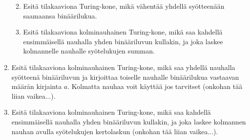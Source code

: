 \documentclass[finnish,11pt,draft]{article}
\begin{document}
\begin{enumerate}
\begin{enumerate}
\begin{enumerate}
\end{enumerate}

\item
Esitä  
tilakaaviona Turing-kone, mikä vähentää yhdellä syötteenään saamaansa binäärilukua. 




\item
Esitä tilakaaviona kolminauhainen Turing-kone, mikä saa kahdellä ensimmäisellä nauhalla yhden binääriluvun kullakin, ja joka laskee kolmannelle nauhalle syötelukujen summan.




 
\end{enumerate}


\item 
Esitä tilakaaviona kolminauhainen  Turing-kone, mikä saa yhdellä nauhalla syötteenä binääriluvun ja kirjoittaa toiselle nauhalle binäärilukua vastaavan määrän kirjainta $a$. Kolmatta nauhaa voit käyttää jos tarvitset (onkohan tää liian vaikea...).

\item
Esitä tilakaaviona kolminauhainen  Turing-kone, 
mikä saa kahdellä ensimmäisellä nauhalla yhden binääriluvun kullakin, ja joka laskee kolmannen nauhan  avulla syötelukujen kertolaskun (onkohan tää liian vaikea...).



\end{enumerate}
\end{document}
